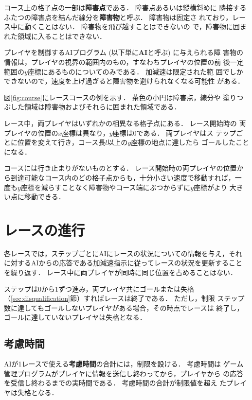\documentclass[11pt]{jarticle}
\newcommand\secref[1]{\mbox{\ref{#1}節}}
\begin{document}
コース上の格子点の一部は{\bf 障害点}である．  障害点あるいは縦横斜めに
隣接するふたつの障害点を結んだ線分を{\bf 障害物}と呼ぶ． 障害物は固定さ
れており，レース中に動くことはない．  障害物を飛び越すことはできないの
で，障害物に囲まれた領域に入ることはできない．

プレイヤを制御するAIプログラム (以下単に{\bf AI}と呼ぶ) に与えられる障
害物の情報は，プレイヤの視界の範囲内のもの，すなわちプレイヤの位置の前
後一定範囲の$y$座標にあるものについてのみである． 加減速は限定された範
囲でしかできないので，速度を上げ過ぎると障害物を避けられなくなる可能性
がある．

図\ref{fig:course}にレースコースの例を示す． 茶色の小円は障害点，線分や
塗りつぶした領域は障害物およびそれらに囲まれた領域である．

レース中，両プレイヤはいずれかの相異なる格子点にある．  レース開始時の
両プレイヤの位置の$x$座標は異なり，$y$座標は$0$である．  両プレイヤはス
テップごとに位置を変えて行き，コース長$l$以上の$y$座標の地点に達したら
ゴールしたことになる．

コースには行き止まりがないものとする． レース開始時の両プレイヤの位置か
ら到達可能なコース内のどの格子点からも，十分小さい速度で移動すれば，一
度も$y$座標を減らすことなく障害物やコース端にぶつからずに$y$座標がより
大きい点に移動できる．

\section{レースの進行}\label{sec:race_process}
各レースでは，ステップごとにAIにレースの状況についての情報を与え，それ
に対するAIからの応答である加減速指示に従ってレースの状況を更新すること
を繰り返す．  レース中に両プレイヤが同時に同じ位置を占めることはない．

ステップは0から1ずつ進み，両プレイヤ共にゴールまたは失格
（\secref{sec:disqualification}）すればレースは終了である． ただし，制限
ステップ数に達してもゴールしないプレイヤがある場合，その時点でレースは
終了し，ゴールに達していないプレイヤは失格となる．

\subsection{考慮時間}\label{sec:consideration_time}
AIが1レースで使える{\bf 考慮時間}の合計には，制限を設ける． 考慮時間は
ゲーム管理プログラムがプレイヤに情報を送信し終わってから，プレイヤから
の応答を受信し終わるまでの実時間である．  考慮時間の合計が制限値を超え
たプレイヤは失格となる．
\end{document}
